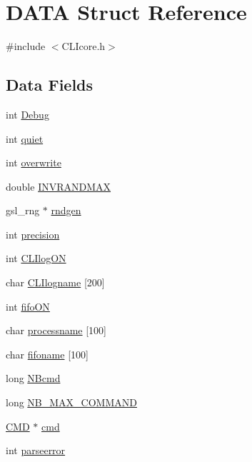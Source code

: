 \hypertarget{structDATA}{\section{D\+A\+T\+A Struct Reference}
\label{structDATA}
}


{\ttfamily \#include $<$C\+L\+Icore.\+h$>$}

\subsection*{Data Fields}
\begin{DoxyCompactItemize}
\item 
int \hyperlink{structDATA_a8148a9459923d124f03989f0c796e137}{Debug}
\item 
int \hyperlink{structDATA_a3f7eda27560572dd2510250a1935deb5}{quiet}
\item 
int \hyperlink{structDATA_a600cb8c85d463a76ca1dfe9d0097c8f3}{overwrite}
\item 
double \hyperlink{structDATA_aa17d253cb7412ac4cbc8f034dfe78308}{I\+N\+V\+R\+A\+N\+D\+M\+A\+X}
\item 
gsl\+\_\+rng $\ast$ \hyperlink{structDATA_a3308ac8a12a70a6b558d38db7666c648}{rndgen}
\item 
int \hyperlink{structDATA_a7b6fce0fc9e6046ffa57b30b8bcd0d1f}{precision}
\item 
int \hyperlink{structDATA_abfc40a5bf0093716bcc793aca3ec678c}{C\+L\+Ilog\+O\+N}
\item 
char \hyperlink{structDATA_a5399f7bda3b78d8c09915d8bb16e4236}{C\+L\+Ilogname} \mbox{[}200\mbox{]}
\item 
int \hyperlink{structDATA_a37b44a7ef0d3d29f33bf3700ec28665e}{fifo\+O\+N}
\item 
char \hyperlink{structDATA_a0733d8fb587cc3f3fc906578f766f1b1}{processname} \mbox{[}100\mbox{]}
\item 
char \hyperlink{structDATA_a604785ee6d2a7393bb2b832633f74fe3}{fifoname} \mbox{[}100\mbox{]}
\item 
long \hyperlink{structDATA_ab3ecb17b2561794d854efcbc47584b19}{N\+Bcmd}
\item 
long \hyperlink{structDATA_afc7d56480cf2e6f4b91ed95be0466d44}{N\+B\+\_\+\+M\+A\+X\+\_\+\+C\+O\+M\+M\+A\+N\+D}
\item 
\hyperlink{structCMD}{C\+M\+D} $\ast$ \hyperlink{structDATA_a09faf15d492cb498a7604e84697044ea}{cmd}
\item 
int \hyperlink{structDATA_a04c14ba8ea1844e3f68888dca0fe3519}{parseerror}

\end{DoxyCompactItemize}
